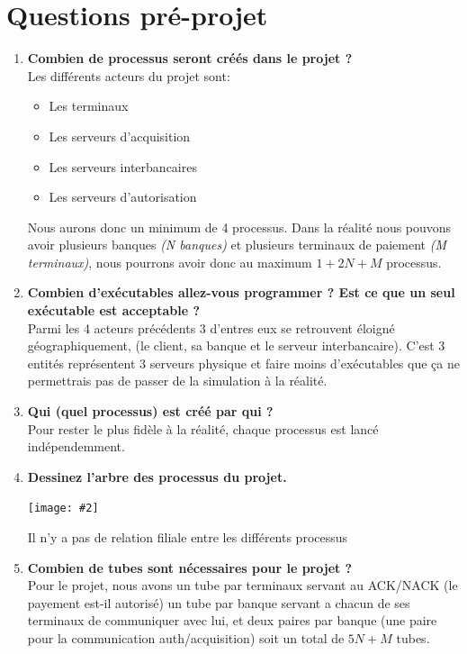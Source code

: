 \documentclass[french, a4paper, 12pt, titlepage]{article}
\newcommand{\graph}[2]{
\medskip
	\begin{center}
		\texttt{[image: \#2]}
	\end{center}
\medskip
}
\begin{document}
\section{Questions pré-projet}
\begin{enumerate}
\item \textbf{Combien de processus seront créés dans le projet ?}\\
Les différents acteurs du projet sont: \begin{itemize}
\item Les terminaux
\item Les serveurs d'acquisition
\item Les serveurs interbancaires
\item Les serveurs d'autorisation
\end{itemize}
Nous aurons donc un minimum de 4 processus.
Dans la réalité nous pouvons avoir plusieurs banques \textit{(N banques)} et plusieurs terminaux de paiement \textit{(M terminaux)}, nous pourrons avoir donc au maximum $1+2N+M$ processus.\\

\item \textbf{Combien d'exécutables allez-vous programmer ? Est ce que un seul exécutable est acceptable ?}\\
Parmi les 4 acteurs précédents 3 d'entres eux se retrouvent éloigné géographiquement, (le client, sa banque et le serveur interbancaire).
C'est 3 entités représentent 3 serveurs physique et faire moins d'exécutables que ça ne permettrais pas de passer de la simulation à la réalité.\\

\item \textbf{Qui (quel processus) est créé par qui ?}\\
Pour rester le plus fidèle à la réalité, chaque processus est lancé indépendemment.\\

\item \textbf{Dessinez l'arbre des processus du projet.}
\smallskip
\begin{center}
\graph{0.3}{fork}
\end{center}
Il n'y a pas de relation filiale entre les différents processus\\

\item \textbf{Combien de tubes sont nécessaires pour le projet ?}\\
Pour le projet, nous avons un tube par terminaux servant au ACK/NACK (le payement est-il autorisé) un tube par banque servant a chacun de ses terminaux de communiquer avec lui, et deux paires par banque (une paire pour la communication auth/acquisition) soit un total de $5N+M$ tubes.\\


\end{enumerate}
\end{document}
